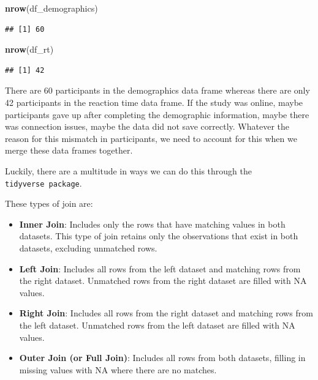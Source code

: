 \documentclass[
]{book}
\newenvironment{Shaded}{\begin{snugshade}}{\end{snugshade}}
\newcommand{\FunctionTok}[1]{\textcolor[rgb]{0.13,0.29,0.53}{\textbf{#1}}}
\newcommand{\NormalTok}[1]{#1}
\begin{document}
\begin{Shaded}
\begin{Highlighting}[]
\FunctionTok{nrow}\NormalTok{(df\_demographics)}
\end{Highlighting}
\end{Shaded}

\begin{verbatim}
## [1] 60
\end{verbatim}

\begin{Shaded}
\begin{Highlighting}[]
\FunctionTok{nrow}\NormalTok{(df\_rt)}
\end{Highlighting}
\end{Shaded}

\begin{verbatim}
## [1] 42
\end{verbatim}

There are 60 participants in the demographics data frame whereas there are only 42 participants in the reaction time data frame. If the study was online, maybe participants gave up after completing the demographic information, maybe there was connection issues, maybe the data did not save correctly. Whatever the reason for this mismatch in participants, we need to account for this when we merge these data frames together.

Luckily, there are a multitude in ways we can do this through the \texttt{tidyverse\ package}.

These types of join are:

\begin{itemize}
\item
  \textbf{Inner Join}: Includes only the rows that have matching values in both datasets. This type of join retains only the observations that exist in both datasets, excluding unmatched rows.
\item
  \textbf{Left Join}: Includes all rows from the left dataset and matching rows from the right dataset. Unmatched rows from the right dataset are filled with NA values.
\item
  \textbf{Right Join}: Includes all rows from the right dataset and matching rows from the left dataset. Unmatched rows from the left dataset are filled with NA values.
\item
  \textbf{Outer Join (or Full Join)}: Includes all rows from both datasets, filling in missing values with NA where there are no matches.
\end{itemize}
\end{document}
